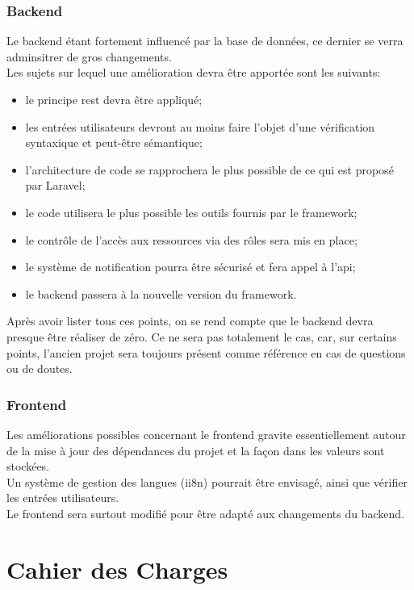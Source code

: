 \documentclass[
    iai, %
    il, %
]{heig-tb}
\begin{document}
\subsubsection{Backend}
Le \Gls{backend} étant fortement influencé par la base de données, ce dernier se verra adminsitrer de gros changements.\\
Les sujets sur lequel une amélioration devra être apportée sont les suivants:
\begin{itemize}
    \item le principe \Gls{rest} devra être appliqué;
    \item les entrées utilisateurs devront au moins faire l'objet d'une vérification syntaxique et peut-être sémantique;
    \item l'architecture de code se rapprochera le plus possible de ce qui est proposé par Laravel;
    \item le code utilisera le plus possible les outils fournis par le \Gls{framework};
    \item le contrôle de l'accès aux ressources via des rôles sera mis en place;
    \item le système de notification pourra être sécurisé et fera appel à l'\Gls{api};
    \item le \Gls{backend} passera à la nouvelle version du \Gls{framework}.
\end{itemize}

Après avoir lister tous ces points, on se rend compte que le \Gls{backend} devra presque être réaliser de
zéro. Ce ne sera pas totalement le cas, car, sur certains points, l'ancien projet sera toujours
présent comme référence en cas de questions ou de doutes.

\subsubsection{Frontend}
Les améliorations possibles concernant le \Gls{frontend} gravite essentiellement autour de la mise à jour des dépendances du projet et la façon dans les valeurs sont stockées.\\
Un système de gestion des langues (ii8n) pourrait être envisagé, ainsi que vérifier les entrées utilisateurs.\\
Le \Gls{frontend} sera surtout modifié pour être adapté aux changements du \Gls{backend}.

\section{Cahier des Charges}
\end{document}
